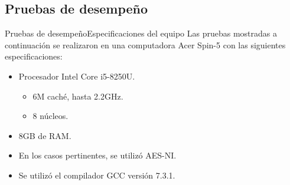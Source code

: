 %
%
%

\subsection{Pruebas de desempeño}

\begin{frame}{Pruebas de desempeño}{Especificaciones del equipo}
  Las pruebas mostradas a continuación se realizaron en una computadora
  Acer Spin-5 con las siguientes especificaciones:
  \begin{itemize}
    \item Procesador Intel Core i5-8250U.
    \begin{itemize}
      \item 6M caché, hasta 2.2GHz.
      \item 8 núcleos.
    \end{itemize}
    \item 8GB de RAM.
    \item En los casos pertinentes, se utilizó AES-NI\footnotemark.
    \item Se utilizó el compilador GCC versión 7.3.1.
  \end{itemize}
\end{frame}


